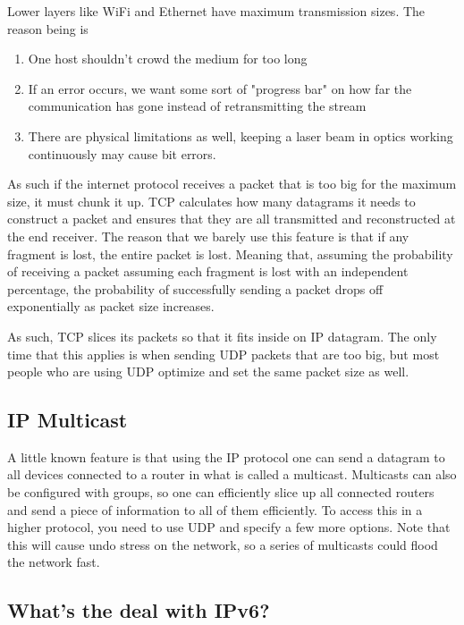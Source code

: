 Lower layers like WiFi and Ethernet have maximum transmission sizes.
The reason being is

\begin{enumerate}
  \item One host shouldn't crowd the medium for too long
  \item If an error occurs, we want some sort of "progress bar" on how far the communication has gone instead of retransmitting the stream
  \item There are physical limitations as well, keeping a laser beam in optics working continuously may cause bit errors.
\end{enumerate}

As such if the internet protocol receives a packet that is too big for the maximum size, it must chunk it up.
TCP calculates how many datagrams it needs to construct a packet and ensures that they are all transmitted and reconstructed at the end receiver.
The reason that we barely use this feature is that if any fragment is lost, the entire packet is lost.
Meaning that, assuming the probability of receiving a packet assuming each fragment is lost with an independent percentage, the probability of successfully sending a packet drops off exponentially as packet size increases.

As such, TCP slices its packets so that it fits inside on IP datagram.
The only time that this applies is when sending UDP packets that are too big, but most people who are using UDP optimize and set the same packet size as well.

\subsection{IP Multicast}

A little known feature is that using the IP protocol one can send a datagram to all devices connected to a router in what is called a multicast.
Multicasts can also be configured with groups, so one can efficiently slice up all connected routers and send a piece of information to all of them efficiently.
To access this in a higher protocol, you need to use UDP and specify a few more options.
Note that this will cause undo stress on the network, so a series of multicasts could flood the network fast.

\subsection{What's the deal with IPv6?}

